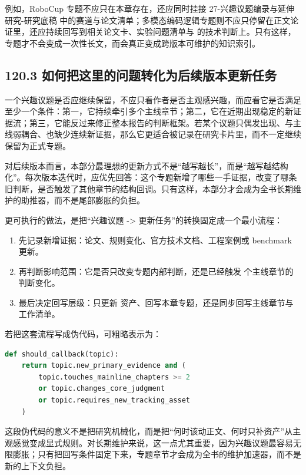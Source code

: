 例如，RoboCup 专题不应只在本章存在，还应同时挂接 27-兴趣议题编录与延伸研究-研究底稿 中的赛道与论文清单；多模态编码逻辑专题则不应只停留在正文论证里，还应持续回写到相关论文卡、实验问题清单与  的技术判断上。只有这样，专题才不会变成一次性长文，而会真正变成跨版本可维护的知识索引。

\subsection*{120.3 如何把这里的问题转化为后续版本更新任务}


一个兴趣议题是否应继续保留，不应只看作者是否主观感兴趣，而应看它是否满足至少一个条件：第一，它持续牵引多个主线章节；第二，它在近期出现稳定的新证据流；第三，它能反过来修正整本报告的判断框架。若某个议题只偶发出现、与主线弱耦合、也缺少连续新证据，那么它更适合被记录在研究卡片里，而不一定继续保留为正式专题。

对后续版本而言，本部分最理想的更新方式不是“越写越长”，而是“越写越结构化”。每次版本迭代时，应优先回答：这个专题新增了哪些一手证据，改变了哪条旧判断，是否触发了其他章节的结构回调。只有这样，本部分才会成为全书长期维护的助推器，而不是尾部膨胀的负担。

更可执行的做法，是把“兴趣议题 -> 更新任务”的转换固定成一个最小流程：

\begin{enumerate}
\item 先记录新增证据：论文、规则变化、官方技术文档、工程案例或 benchmark 更新。
\item 再判断影响范围：它是否只改变专题内部判断，还是已经触发 \texttt{} 个主线章节的判断变化。
\item 最后决定回写层级：只更新  资产、回写本章专题，还是同步回写主线章节与工作清单。
\end{enumerate}

若把这套流程写成伪代码，可粗略表示为：

\begin{lstlisting}[language=python]
def should_callback(topic):
    return topic.new_primary_evidence and (
        topic.touches_mainline_chapters >= 2
        or topic.changes_core_judgment
        or topic.requires_new_tracking_asset
    )
\end{lstlisting}

这段伪代码的意义不是把研究机械化，而是把“何时该动正文、何时只补资产”从主观感觉变成显式规则。对长期维护来说，这一点尤其重要，因为兴趣议题最容易无限膨胀；只有把回写条件固定下来，专题章节才会成为全书的维护加速器，而不是新的上下文负担。

